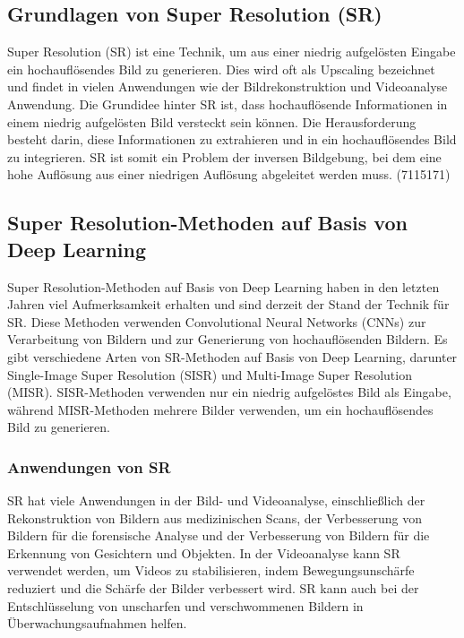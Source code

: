    \subsection{Grundlagen von Super Resolution (SR)}
    
        Super Resolution (SR) ist eine Technik, um aus einer niedrig aufgelösten Eingabe ein hochauflösendes Bild zu generieren.      
        Dies wird oft als Upscaling bezeichnet und findet in vielen Anwendungen wie der Bildrekonstruktion und Videoanalyse Anwendung.
        Die Grundidee hinter SR ist, dass hochauflösende Informationen in einem niedrig aufgelösten Bild versteckt sein können.      
        Die Herausforderung besteht darin, diese Informationen zu extrahieren und in ein hochauflösendes Bild zu integrieren.      
        SR ist somit ein Problem der inversen Bildgebung, bei dem eine hohe Auflösung aus einer niedrigen Auflösung abgeleitet werden muss.
        \footfullcite(7115171)
    \subsection{Super Resolution-Methoden auf Basis von Deep Learning}
    
        Super Resolution-Methoden auf Basis von Deep Learning haben in den letzten Jahren viel Aufmerksamkeit erhalten und sind derzeit der Stand der Technik für SR.      
        Diese Methoden verwenden Convolutional Neural Networks (CNNs) zur Verarbeitung von Bildern und zur Generierung von hochauflösenden Bildern.
        Es gibt verschiedene Arten von SR-Methoden auf Basis von Deep Learning, darunter Single-Image Super Resolution (SISR) und Multi-Image Super Resolution (MISR).      
        SISR-Methoden verwenden nur ein niedrig aufgelöstes Bild als Eingabe, während MISR-Methoden mehrere Bilder verwenden, um ein hochauflösendes Bild zu generieren.
    
    \subsubsection{Anwendungen von SR}
    
        SR hat viele Anwendungen in der Bild- und Videoanalyse, einschließlich der Rekonstruktion von Bildern aus medizinischen Scans, der Verbesserung von Bildern für die forensische Analyse und der Verbesserung von Bildern für die Erkennung von Gesichtern und Objekten.
        In der Videoanalyse kann SR verwendet werden, um Videos zu stabilisieren, indem Bewegungsunschärfe reduziert und die Schärfe der Bilder verbessert wird.      
        SR kann auch bei der Entschlüsselung von unscharfen und verschwommenen Bildern in Überwachungsaufnahmen helfen.
    
